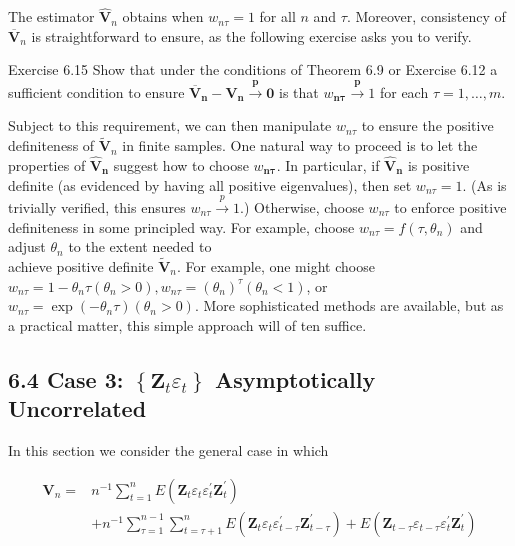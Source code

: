 \documentclass[10pt]{article}
\begin{document}
The estimator $\hat{\mathbf{V}}_{n}$ obtains when $w_{n \tau}=1$ for all $n$ and $\tau$. Moreover, consistency of $\overline{\mathbf{V}}_{n}$ is straightforward to ensure, as the following exercise asks you to verify.

Exercise 6.15 Show that under the conditions of Theorem 6.9 or Exercise 6.12 a sufficient condition to ensure $\overline{\mathbf{V}}_{\boldsymbol{n}}-\mathbf{V}_{\boldsymbol{n}} \xrightarrow{\boldsymbol{p}} \mathbf{0}$ is that $w_{\boldsymbol{n} \boldsymbol{\tau}} \xrightarrow{\boldsymbol{p}} 1$ for each $\tau=1, \ldots, m$.

Subject to this requirement, we can then manipulate $w_{n \tau}$ to ensure the positive definiteness of $\tilde{\mathbf{V}}_{n}$ in finite samples. One natural way to proceed is to let the properties of $\hat{\mathbf{V}}_{\boldsymbol{n}}$ suggest how to choose $w_{\boldsymbol{n} \boldsymbol{\tau}}$. In particular, if $\hat{\mathbf{V}}_{\boldsymbol{n}}$ is positive definite (as evidenced by having all positive eigenvalues), then set $w_{n \tau}=1$. (As is trivially verified, this ensures $w_{n \tau} \xrightarrow{p} 1$.) Otherwise, choose $w_{n \tau}$ to enforce positive definiteness in some principled way. For example, choose $w_{n \tau}=f\left(\tau, \theta_{n}\right)$ and adjust $\theta_{n}$ to the extent needed to\\
achieve positive definite $\tilde{\mathbf{V}}_{n}$. For example, one might choose $w_{n \tau}=1-\theta_{n} \tau \left(\theta_{n}>0\right), w_{n \tau}=\left(\theta_{n}\right)^{\tau}\left(\theta_{n}<1\right)$, or $w_{n \tau}=\exp \left(-\theta_{n} \tau\right)\left(\theta_{n}>0\right)$. More sophisticated methods are available, but as a practical matter, this simple approach will of ten suffice.

\subsection*{6.4 Case 3: $\left\{\mathbf{Z}_{t} \varepsilon_{t}\right\}$ Asymptotically Uncorrelated}
In this section we consider the general case in which

$$
\begin{aligned}
\mathbf{V}_{n}= & n^{-1} \sum_{t=1}^{n} E\left(\mathbf{Z}_{t} \varepsilon_{t} \varepsilon_{t}^{\prime} \mathbf{Z}_{t}^{\prime}\right) \\
& +n^{-1} \sum_{\tau=1}^{n-1} \sum_{t=\tau+1}^{n} E\left(\mathbf{Z}_{t} \varepsilon_{t} \varepsilon_{t-\tau}^{\prime} \mathbf{Z}_{t-\tau}^{\prime}\right)+E\left(\mathbf{Z}_{t-\tau} \varepsilon_{t-\tau} \varepsilon_{t}^{\prime} \mathbf{Z}_{t}^{\prime}\right)
\end{aligned}
$$
\end{document}
